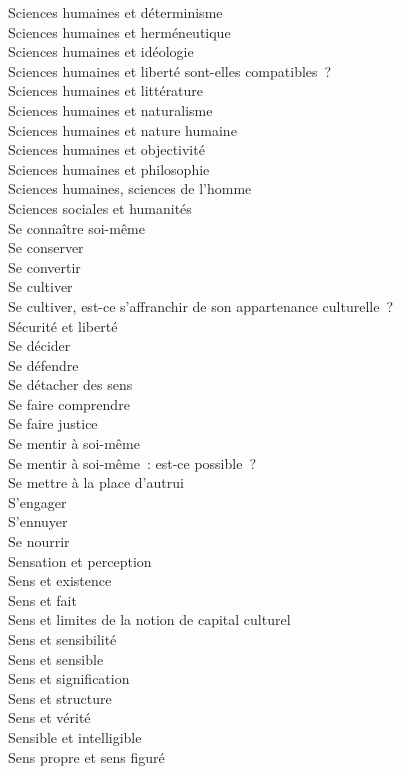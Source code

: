 \documentclass[a4paper,12pt]{article}
\begin{document}
Sciences humaines et déterminisme \\
Sciences humaines et herméneutique \\
Sciences humaines et idéologie \\
Sciences humaines et liberté sont-elles compatibles ? \\
Sciences humaines et littérature \\
Sciences humaines et naturalisme \\
Sciences humaines et nature humaine \\
Sciences humaines et objectivité \\
Sciences humaines et philosophie \\
Sciences humaines, sciences de l'homme \\
Sciences sociales et humanités \\
Se connaître soi-même \\
Se conserver \\
Se convertir \\
Se cultiver \\
Se cultiver, est-ce s'affranchir de son appartenance culturelle ? \\
Sécurité et liberté \\
Se décider \\
Se défendre \\
Se détacher des sens \\
Se faire comprendre \\
Se faire justice \\
Se mentir à soi-même \\
Se mentir à soi-même : est-ce possible ? \\
Se mettre à la place d'autrui \\
S'engager \\
S'ennuyer \\
Se nourrir \\
Sensation et perception \\
Sens et existence \\
Sens et fait \\
Sens et limites de la notion de capital culturel \\
Sens et sensibilité \\
Sens et sensible \\
Sens et signification \\
Sens et structure \\
Sens et vérité \\
Sensible et intelligible \\
Sens propre et sens figuré \\
\end{document}
